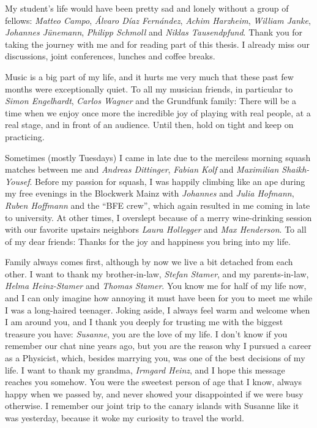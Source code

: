 My student's life would have been pretty sad and lonely without a group of fellows: {\it Matteo Campo}, {\it Álvaro Díaz Fernández}, {\it Achim Harzheim}, {\it William Janke}, {\it Johannes Jünemann}, {\it Philipp Schmoll} and {\it Niklas Tausendpfund}.
Thank you for taking the journey with me and for reading part of this thesis.
I already miss our discussions, joint conferences, lunches and coffee breaks.

Music is a big part of my life, and it hurts me very much that these past few months were exceptionally quiet.
To all my musician friends, in particular to {\it Simon Engelhardt}, {\it Carlos Wagner} and the Grundfunk family:
There will be a time when we enjoy once more the incredible joy of playing with real people, at a real stage, and in front of an audience.
Until then, hold on tight and keep on practicing.

Sometimes (mostly Tuesdays) I came in late due to the merciless morning squash matches between me and {\it Andreas Dittinger}, {\it Fabian Kolf} and {\it Maximilian Shaikh-Yousef}.
Before my passion for squash, I was happily climbing like an ape during my free evenings in the Blockwerk Mainz with {\it Johannes} and {\it Julia Hofmann}, {\it Ruben Hoffmann} and the ``BFE crew'', which again resulted in me coming in late to university.
At other times, I overslept because of a merry wine-drinking session with our favorite upstairs neighbors {\it Laura Hollegger} and {\it Max Henderson}.
To all of my dear friends: Thanks for the joy and happiness you bring into my life.

Family always comes first, although by now we live a bit detached from each other.
I want to thank my brother-in-law, {\it Stefan Stamer}, and my parents-in-law, {\it Helma Heinz-Stamer} and {\it Thomas Stamer}.
You know me for half of my life now, and I can only imagine how annoying it must have been for you to meet me while I was a long-haired teenager.
Joking aside, I always feel warm and welcome when I am around you, and I thank you deeply for trusting me with the biggest treasure you have:
{\it Susanne}, you are the love of my life.
I don't know if you remember our chat nine years ago, but you are the reason why I pursued a career as a Physicist, which, besides marrying you, was one of the best decisions of my life.
I want to thank my grandma, {\it Irmgard Heinz}, and I hope this message reaches you somehow.
You were the sweetest person of age that I know, always happy when we passed by, and never showed your disappointed if we were busy otherwise.
I remember our joint trip to the canary islands with Susanne like it was yesterday, because it woke my curiosity to travel the world.

